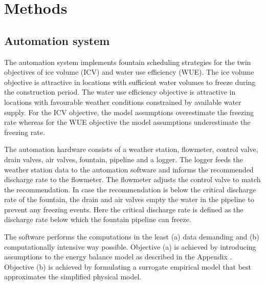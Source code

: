 \documentclass[tc, manuscript]{copernicus}
\begin{document}
\section{Methods}

\subsection{Automation system}
The automation system implements fountain scheduling strategies for the twin objectives of ice volume (ICV) and water
use efficiency (WUE). The ice volume objective is attractive in locations with sufficient water volumes to
freeze during the construction period. The water use efficiency objective is attractive in locations with
favourable weather conditions constrained by available water supply. For the ICV objective, the model assumptions
overestimate the freezing rate whereas for the WUE objective the model assumptions underestimate the freezing
rate. 

The automation hardware consists of a weather station, flowmeter, control valve, drain valves, air valves,
fountain, pipeline and a logger. The logger feeds the weather station data to the automation software and
informs the recommended discharge rate to the flowmeter. The flowmeter adjusts the control valve to match the
recommendation. In case the recommendation is below the critical discharge rate of the fountain, the drain and
air valves empty the water in the pipeline to prevent any freezing events. Here the critical discharge rate is
defined as the discharge rate below which the fountain pipeline can freeze.


The software performs the computations in the least (a) data demanding and (b) computationally intensive way
possible. Objective (a) is achieved by introducing assumptions to the energy balance model as described in the
Appendix . Objective (b) is achieved by formulating a surrogate empirical model that best approximates the
simplified physical model. 
\end{document}
